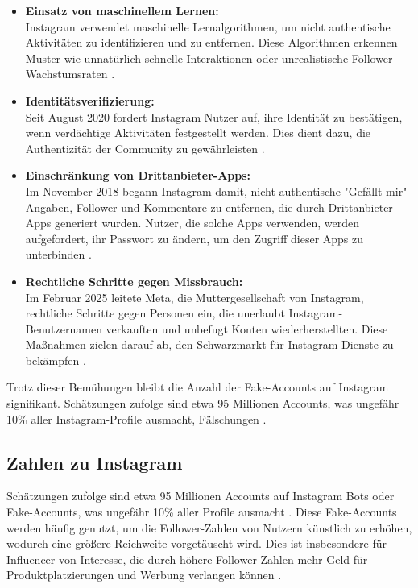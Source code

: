 \documentclass[12pt]{report}
\begin{document}
\begin{itemize}
	\item \textbf{Einsatz von maschinellem Lernen:} \\
	Instagram verwendet maschinelle Lernalgorithmen, um nicht authentische Aktivitäten zu identifizieren und zu entfernen. Diese Algorithmen erkennen Muster wie unnatürlich schnelle Interaktionen oder unrealistische Follower-Wachstumsraten \cite{instagram_authenticity_measures}.
	
	\item \textbf{Identitätsverifizierung:} \\
	Seit August 2020 fordert Instagram Nutzer auf, ihre Identität zu bestätigen, wenn verdächtige Aktivitäten festgestellt werden. Dies dient dazu, die Authentizität der Community zu gewährleisten \cite{instagram_authenticity_measures}.
	
	\item \textbf{Einschränkung von Drittanbieter-Apps:} \\
	Im November 2018 begann Instagram damit, nicht authentische "Gefällt mir"-Angaben, Follower und Kommentare zu entfernen, die durch Drittanbieter-Apps generiert wurden. Nutzer, die solche Apps verwenden, werden aufgefordert, ihr Passwort zu ändern, um den Zugriff dieser Apps zu unterbinden \cite{instagram_reducing_inauthentic_activity}.
	
	\item \textbf{Rechtliche Schritte gegen Missbrauch:} \\
	Im Februar 2025 leitete Meta, die Muttergesellschaft von Instagram, rechtliche Schritte gegen Personen ein, die unerlaubt Instagram-Benutzernamen verkauften und unbefugt Konten wiederherstellten. Diese Maßnahmen zielen darauf ab, den Schwarzmarkt für Instagram-Dienste zu bekämpfen \cite{meta_lawsuits_black_market}.
\end{itemize}

Trotz dieser Bemühungen bleibt die Anzahl der Fake-Accounts auf Instagram signifikant. Schätzungen zufolge sind etwa 95 Millionen Accounts, was ungefähr 10\% aller Instagram-Profile ausmacht, Fälschungen \cite{instagram_fake_accounts_statistics}.

\subsection{Zahlen zu Instagram}

Schätzungen zufolge sind etwa 95 Millionen Accounts auf Instagram Bots oder Fake-Accounts, was ungefähr 10\% aller Profile ausmacht \cite{ghost_data_2018}. Diese Fake-Accounts werden häufig genutzt, um die Follower-Zahlen von Nutzern künstlich zu erhöhen, wodurch eine größere Reichweite vorgetäuscht wird. Dies ist insbesondere für Influencer von Interesse, die durch höhere Follower-Zahlen mehr Geld für Produktplatzierungen und Werbung verlangen können \cite{futurezone_2018}.
\end{document}
